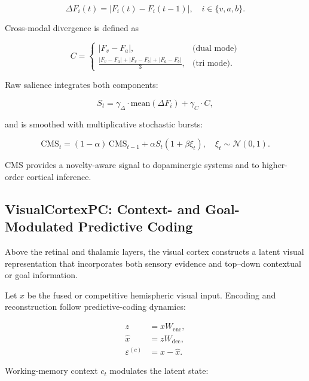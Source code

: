 \documentclass[9pt]{elife}
\begin{document}
\begin{equation}
\Delta F_i(t) = |F_i(t) - F_i(t-1)|,
\quad i \in \{v,a,b\}.
\end{equation}

Cross-modal divergence is defined as

\begin{equation}
C = 
\begin{cases}
|F_v - F_a|, 
& \text{(dual mode)} \\[6pt]
\frac{|F_v - F_a| + |F_v - F_b| + |F_a - F_b|}{3}, 
& \text{(tri mode)}.
\end{cases}
\end{equation}

Raw salience integrates both components:

\begin{equation}
S_t = \gamma_{\Delta} \cdot \mathrm{mean}(\Delta F_i)
    + \gamma_{C} \cdot C,
\end{equation}

and is smoothed with multiplicative stochastic bursts:

\begin{equation}
\mathrm{CMS}_t
= (1-\alpha)\,\mathrm{CMS}_{t-1}
+ \alpha S_t (1 + \beta\xi_t),
\quad \xi_t \sim \mathcal{N}(0,1).
\end{equation}

CMS provides a novelty-aware signal to dopaminergic systems and to higher-order
cortical inference.

\subsection{VisualCortexPC: Context- and Goal-Modulated Predictive Coding}

Above the retinal and thalamic layers, the visual cortex constructs a latent visual
representation that incorporates both sensory evidence and top–down contextual or
goal information.

Let $x$ be the fused or competitive hemispheric visual input.  
Encoding and reconstruction follow predictive-coding dynamics:

\begin{align}
z &= x W_{\mathrm{enc}}, \\
\hat{x} &= z W_{\mathrm{dec}}, \\
\varepsilon^{(c)} &= x - \hat{x}.
\end{align}

Working-memory context $c_t$ modulates the latent state:
\end{document}
